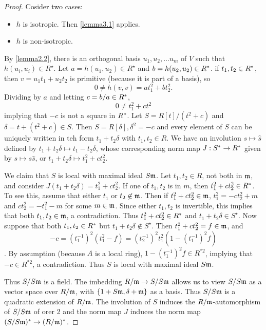 \begin{proof}
Cosider two cases:
\begin{itemize}
\item $h$ is isotropic. Then \ref{lemma3.1} applies.
\item $h$ is non-isotropic.
\end{itemize}
By \cref{lemma2.2}, %
there is an orthogonal basis $u_1, u_2, \dotsc u_m$ of $V$ such that $h(u_i, u_i) \in R^\star$.
Let $a = h(u_1, u_2) \in R^\star$ and $b = h(u_2, u_2) \in R^*$.
if $t_1, t_2 \in R^*$, then $v = u_1 t_1 + u_2 t_2$ is primitive (because it is part of a basis),
so
\[
0 \ne h(v, v) = a t_1^2 + b t_2^2.
\]
Dividing by $a$ and letting $c = b/a \in R^*$,
\[
0 \ne t_1^2 + ct^2
\]
implying that $-c$ is not a square in $R^*$.
Let $S = R[t] / (t^2 + c)$ and $\delta = t + (t^2 + c) \in S$.
Then $S = R[\delta], \delta^2 = -c$ and every element of $S$ can be uniquely written in teh form $t_1 + t_2 \delta$ with $t_1, t_2 \in R$.
We have an involution $s \mapsto \hat{s}$ defined by $t_1 + t_2 \delta \mapsto t_1 - t_2 \delta$,
whose corresponding norm map $J: S^* \to R^*$ given by $s \mapsto s \hat{s}$, or $t_1 + t_2 \delta \mapsto t_1^2 + c t_2^2$.

We claim that $S$ is local with maximal ideal $S\mathfrak{m}$.
Let $t_1, t_2 \in R$, not both in $\mathfrak{m}$, and consider $J(t_1 + t_2 \delta) = t_1^2 + c t_2^2$.
If one of $t_1, t_2$ is in $m$, then $t_1^2 + c t_2^2 \in R^*$.
To see this, assume that either $t_1$ or $t_2 \not\in \mathfrak{m}$.
Then if $t_1^2 + ct_2^2 \in \mathfrak{m}$, $t_1^2 = -ct_2^2 + m$ and $ct_2^2 = -t_1^2 - m$ for some $m \in \mathfrak{m}$.
Since either $t_1, t_2$ is invertible, this implies that both $t_1, t_2 \in \mathfrak{m}$, a contradiction.
Thus $t_1^2 + c t_2^2 \in R^*$ and $t_1 + t_2 \delta \in S^\star$.
Now suppose that both $t_1, t_2 \in R^*$ but $t_1 + t_2 \delta \not \in S^\star$.
Then $t_1^2 + ct_2^2 = f \in \mathfrak{m}$, and
\[
-c = (t_1^{-1})^2(t_1^2 - f) = (t_2^{-1})^2 t_1^2(1 - (t_1^{-1})^2f)
\].
By assumption (because $A$ is a local ring), $1 - (t_1^{-1})^2 f \in R^{*2}$, implying that $-c \in R^{*2}$, a contradiction.
Thus $S$ is local with maximal ideal $S\mathfrak{m}$.

Thus $S/S\mathfrak{m}$ is a field. The imbedding $R/\mathfrak{m} \to S/S\mathfrak{m}$ allows us to view $S/S\mathfrak{m}$ as a vector space over $R/\mathfrak{m}$,
with $\{1 + S\mathfrak{m}, \delta + \mathfrak{m} \}$ as a basis. Thus $S/S\mathfrak{m}$ is a quadratic extension of $R/\mathfrak{m}$.
The involution of $S$ induces the $R/\mathfrak{m}$-automorphism of $S/S\mathfrak{m}$ of orer 2 and the norm map $J$ induces the norm map $(S/S\mathfrak{m})^* \to (R/\mathfrak{m})^*$.


\end{proof}
